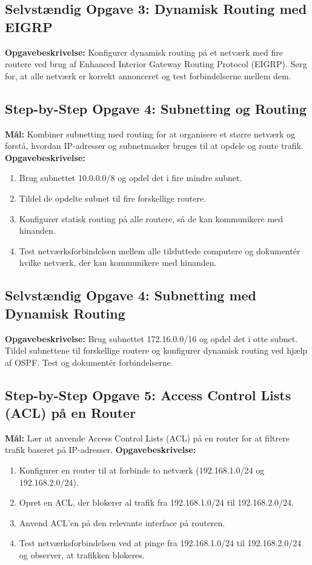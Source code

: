\subsection*{Selvstændig Opgave 3: Dynamisk Routing med EIGRP}
\textbf{Opgavebeskrivelse:} Konfigurer dynamisk routing på et netværk med fire routere ved brug af Enhanced Interior Gateway Routing Protocol (EIGRP). Sørg for, at alle netværk er korrekt annonceret og test forbindelserne mellem dem.

\subsection*{Step-by-Step Opgave 4: Subnetting og Routing}
\textbf{Mål:} Kombiner subnetting med routing for at organisere et større netværk og forstå, hvordan IP-adresser og subnetmasker bruges til at opdele og route trafik.
\newline\newline\noindent
\textbf{Opgavebeskrivelse:}
\begin{enumerate}
	\item Brug subnettet 10.0.0.0/8 og opdel det i fire mindre subnet.
	\item Tildel de opdelte subnet til fire forskellige routere.
	\item Konfigurer statisk routing på alle routere, så de kan kommunikere med hinanden.
	\item Test netværksforbindelsen mellem alle tilsluttede computere og dokumentér hvilke netværk, der kan kommunikere med hinanden.
\end{enumerate}

\subsection*{Selvstændig Opgave 4: Subnetting med Dynamisk Routing}
\textbf{Opgavebeskrivelse:} Brug subnettet 172.16.0.0/16 og opdel det i otte subnet. Tildel subnettene til forskellige routere og konfigurer dynamisk routing ved hjælp af OSPF. Test og dokumentér forbindelserne.

\subsection*{Step-by-Step Opgave 5: Access Control Lists (ACL) på en Router}
\textbf{Mål:} Lær at anvende Access Control Lists (ACL) på en router for at filtrere trafik baseret på IP-adresser.
\newline\newline\noindent
\textbf{Opgavebeskrivelse:}
\begin{enumerate}
	\item Konfigurer en router til at forbinde to netværk (192.168.1.0/24 og 192.168.2.0/24).
	\item Opret en ACL, der blokerer al trafik fra 192.168.1.0/24 til 192.168.2.0/24.
	\item Anvend ACL'en på den relevante interface på routeren.
	\item Test netværksforbindelsen ved at pinge fra 192.168.1.0/24 til 192.168.2.0/24 og observer, at trafikken blokeres.
\end{enumerate}

